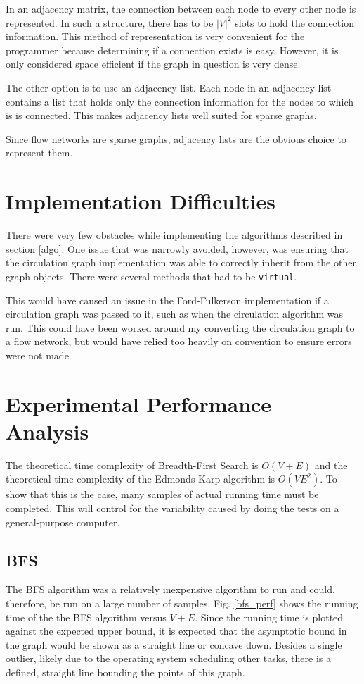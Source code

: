 \documentclass[conference]{IEEEtran}
\begin{document}
In an adjacency matrix, the connection between each node to every other node is represented.
In such a structure, there has to be $|V|^2$ slots to hold the connection information. This
method of representation is very convenient for the programmer because determining if a 
connection exists is easy. However, it is only considered space efficient if the graph in
question is very dense. 

The other option is to use an adjacency list. Each node in an adjacency list contains a list 
that holds only the connection information for the nodes to which is is connected. This makes 
adjacency lists well suited for sparse graphs. 

Since flow networks are sparse graphs, adjacency lists are the obvious choice to represent them.

\section{Implementation Difficulties} %
There were very few obstacles while implementing the algorithms described in section 
\ref{algo}. One issue that was narrowly avoided, however, was ensuring that the circulation
graph implementation was able to correctly inherit from the other graph objects. There
were several methods that had to be \lstinline{virtual}. 

This would have caused an issue in the Ford-Fulkerson implementation if a circulation graph
was passed to it, such as when the circulation algorithm was run. This could have been 
worked around my converting the circulation graph to a flow network, but would have relied
too heavily on convention to ensure errors were not made.


\section{Experimental Performance Analysis}
The theoretical time complexity of Breadth-First Search is $O(V + E)$ and the theoretical
time complexity of the Edmonds-Karp algorithm is $O(VE^2)$. To show that this is the case,
many samples of actual running time must be completed. This will control for the variability
caused by doing the tests on a general-purpose computer. 

\subsection{BFS}
The BFS algorithm was a relatively inexpensive algorithm to run and could, therefore,
be run on a large number of samples. Fig. \ref{bfs_perf} shows the running time of the 
the BFS algorithm versus $V + E$. Since the running time is plotted against the expected
upper bound, it is expected that the asymptotic bound in the graph would be shown as a 
straight line or concave down. Besides a single outlier, likely due to the operating 
system scheduling other tasks, there is a defined, straight line bounding the points of 
this graph. 
\end{document}
